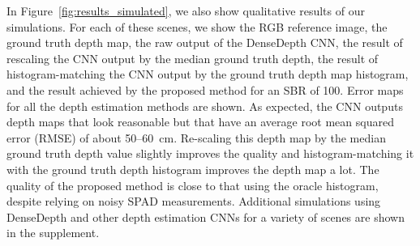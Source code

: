 In Figure~\ref{fig:results_simulated}, we also show qualitative results of our simulations. For each of these scenes, we show the RGB reference image, the ground truth depth map, the raw output of the DenseDepth CNN, the result of rescaling the CNN output by the median ground truth depth, the result of histogram-matching the CNN output by the ground truth depth map histogram, and the result achieved by the proposed method for an SBR of 100. Error maps for all the depth estimation methods are shown. As expected, the CNN outputs depth maps that look reasonable but that have an average root mean squared error (RMSE) of about 50--60~cm. Re-scaling this depth map by the median ground truth depth value slightly improves the quality and histogram-matching it with the ground truth depth histogram improves the depth map a lot. The quality of the proposed method is close to that using the oracle histogram, despite relying on noisy SPAD measurements. Additional simulations using DenseDepth and other depth estimation CNNs for a variety of scenes are shown in the supplement.


